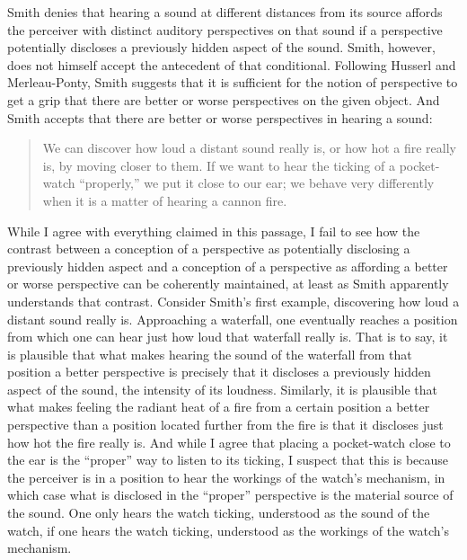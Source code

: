 Smith denies that hearing a sound at different distances from its source affords the perceiver with distinct auditory perspectives on that sound if a perspective potentially discloses a previously hidden aspect of the sound. Smith, however, does not himself accept the antecedent of that conditional. Following Husserl and Merleau-Ponty, Smith suggests that it is sufficient for the notion of perspective to get a grip that there are better or worse perspectives on the given object. And Smith accepts that there are better or worse perspectives in hearing a sound:
\begin{quote}
	We can discover how loud a distant sound really is, or how hot a fire really is, by moving closer to them. If we want to hear the ticking of a pocket-watch ``properly,'' we put it close to our ear; we behave very differently when it is a matter of hearing a cannon fire. \citep[135]{Smith:2002sa}
\end{quote}
While I agree with everything claimed in this passage, I fail to see how the contrast between a conception of a perspective as potentially disclosing a previously hidden aspect and a conception of a perspective as affording a better or worse perspective can be coherently maintained, at least as Smith apparently understands that contrast. Consider Smith's first example, discovering how loud a distant sound really is. Approaching a waterfall, one eventually reaches a position from which one can hear just how loud that waterfall really is. That is to say, it is plausible that what makes hearing the sound of the waterfall from that position a better perspective is precisely that it discloses a previously hidden aspect of the sound, the intensity of its loudness. Similarly, it is plausible that what makes feeling the radiant heat of a fire from a certain position a better perspective than a position located further from the fire is that it discloses just how hot the fire really is. And while I agree that placing a pocket-watch close to the ear is the ``proper'' way to listen to its ticking, I suspect that this is because the perceiver is in a position to hear the workings of the watch's mechanism, in which case what is disclosed in the ``proper'' perspective is the material source of the sound. One only hears the watch ticking, understood as the sound of the watch, if one hears the watch ticking, understood as the workings of the watch's mechanism.

